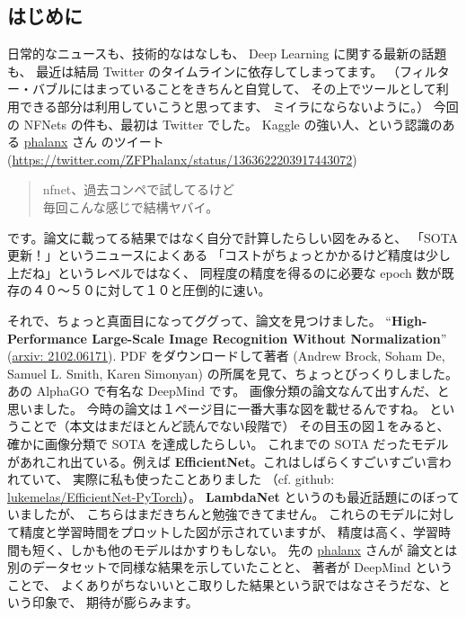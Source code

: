 \documentclass[dvipdfmx,autodetect-engine,10pt,b5paper,papersize,openany,dvipsnames]{jsbook}
\begin{document}
\begin{multicols}{2}

\section{はじめに}
日常的なニュースも、技術的なはなしも、 Deep Learning に関する最新の話題も、
最近は結局 Twitter のタイムラインに依存してしまってます。
（フィルター・バブルにはまっていることをきちんと自覚して、
その上でツールとして利用できる部分は利用していこうと思ってます、
ミイラにならないように。）
今回の NFNets の件も、最初は Twitter でした。
Kaggle の強い人、という認識のある \href{https://twitter.com/ZFPhalanx}{phalanx} さん
のツイート (\url{https://twitter.com/ZFPhalanx/status/1363622203917443072})
\begin{quotation}
  \noindent
  nfnet、過去コンペで試してるけど\\
  毎回こんな感じで結構ヤバイ。
\end{quotation}
です。論文に載ってる結果ではなく自分で計算したらしい図をみると、
「SOTA 更新！」というニュースによくある
「コストがちょっとかかるけど精度は少し上だね」というレベルではなく、
同程度の精度を得るのに必要な epoch 数が既存の４０〜５０に対して１０と圧倒的に速い。

それで、ちょっと真面目になってググって、論文を見つけました。
``\textbf{High-Performance Large-Scale Image Recognition Without Normalization}''
(\href{https://arxiv.org/abs/2102.06171}{arxiv: 2102.06171}).
PDF をダウンロードして著者
(Andrew Brock, Soham De, Samuel L. Smith, Karen Simonyan)
の所属を見て、ちょっとびっくりしました。あの AlphaGO で有名な DeepMind です。
画像分類の論文なんて出すんだ、と思いました。
今時の論文は１ページ目に一番大事な図を載せるんですね。
ということで（本文はまだほとんど読んでない段階で）
その目玉の図１をみると、確かに画像分類で SOTA を達成したらしい。
これまでの SOTA だったモデルがあれこれ出ている。例えば
{\bfseries EfficientNet}。これはしばらくすごいすごい言われていて、
実際に私も使ったことありました
（cf. github: \href{https://github.com/lukemelas/EfficientNet-PyTorch}{lukemelas/EfficientNet-PyTorch}）。
{\bfseries LambdaNet} というのも最近話題にのぼっていましたが、
こちらはまだきちんと勉強できてません。
これらのモデルに対して精度と学習時間をプロットした図が示されていますが、
精度は高く、学習時間も短く、しかも他のモデルはかすりもしない。
先の \href{https://twitter.com/ZFPhalanx}{phalanx} さんが
論文とは別のデータセットで同様な結果を示していたことと、
著者が DeepMind ということで、
よくありがちないいとこ取りした結果という訳ではなさそうだな、という印象で、
期待が膨らみます。



\end{multicols}
\end{document}
